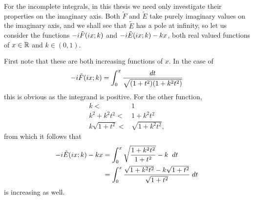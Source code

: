 For the incomplete integrals, in this thesis we need only investigate their properties on the imaginary axis. Both $\tilde{F}$ and $\tilde{E}$ take purely imaginary values on the imaginary axis, and we shall see that $\tilde{E}$ has a pole at infinity, so let us consider the functions $-i \tilde{F}(i x; k)$ and $-i \tilde{E}(i x; k) - k x$, both real valued functions of $x \in \mathbb{R}$ and $k\in (0,1)$.

First note that these are both increasing functions of $x$. In the case of
\[
-i \tilde{F}(i x;k) = \int_0^x \frac{dt}{\sqrt{(1+t^2)(1+k^2t^2)}}
\]
this is obvious as the integrand is positive. For the other function,
\begin{align*}
k <& 1 \\
k^2 + k^2 t^2 <& 1 + k^2t^2 \\
k \sqrt{1 + t^2} <& \sqrt{1 + k^2t^2},
\end{align*}
from which it follows that
\begin{align*}
-i \tilde{E}(i x; k) - k x
&= \int_0^x \sqrt{\frac{1+k^2t^2}{1+t^2}} - k \;\;dt\\
&= \int_0^x \frac{\sqrt{1+k^2t^2} - k\sqrt{1+t^2}}{\sqrt{1+t^2}}\;dt
\end{align*}
is increasing as well.

